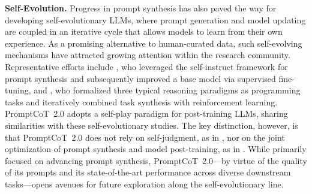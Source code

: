 \textbf{Self-Evolution.} Progress in prompt synthesis has also paved the way for developing self-evolutionary LLMs, where prompt generation and model updating are coupled in an iterative cycle that allows models to learn from their own experience. As a promising alternative to human-curated data, such self-evolving mechanisms have attracted growing attention within the research community. Representative efforts include \citet{yuan2024self}, who leveraged the self-instruct framework \citep{wang2023self} for prompt synthesis and subsequently improved a base model via supervised fine-tuning, and \citet{zhao2025absolute}, who formalized three typical reasoning paradigms as programming tasks and iteratively combined task synthesis with reinforcement learning. PromptCoT~2.0 adopts a self-play paradigm for post-training LLMs, sharing similarities with these self-evolutionary studies. The key distinction, however, is that PromptCoT~2.0 does not rely on self-judgment, as in \citet{yuan2024self}, nor on the joint optimization of prompt synthesis and model post-training, as in \citet{zhao2025absolute}. While primarily focused on advancing prompt synthesis, PromptCoT~2.0—by virtue of the quality of its prompts and its state-of-the-art performance across diverse downstream tasks—opens avenues for future exploration along the self-evolutionary line.





